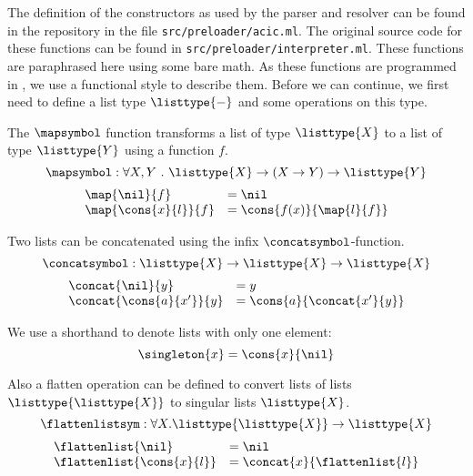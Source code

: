 The definition of the constructors as used by the parser and resolver can be found
in the \roerei repository in the file \lstinline{src/preloader/acic.ml}.
The original source code for these functions can be found in \lstinline{src/preloader/interpreter.ml}.
These functions are paraphrased here using some bare math.
As these functions are programmed in \ocaml, we use a functional style to describe them.
Before we can continue, we first need to define a list type $\listtype{-}$ and some operations on this type.

\begin{definition}[\mapsymbol]
  The $\mapsymbol$ function transforms a list of type $\listtype{X}$ to a list of type $\listtype{Y}$ using a function $f$.
  \[ \mapsymbol : \forall X, Y ~.~ \listtype{X} \rightarrow (X \rightarrow Y) \rightarrow \listtype{Y} \]
  \[ \begin{array}{ll}
      \map{\nil}{f} & = \nil \\
      \map{\cons{x}{l}}{f} & = \cons{f(x)}{\map{l}{f}} \\
    \end{array} \]
\end{definition}

\begin{definition}[\concatsymbol]
  Two lists can be concatenated using the infix $\concatsymbol$-function.
  \[ \concatsymbol : \listtype{X} \rightarrow \listtype{X} \rightarrow \listtype{X} \]
  \[ \begin{array}{ll}
      \concat{\nil}{y} & = y \\
      \concat{\cons{a}{x'}}{y} & = \cons{a}{\concat{x'}{y}} \\
    \end{array} \]
\end{definition}

\begin{definition}[\singleton{-}]
  We use a shorthand to denote lists with only one element:
  \[ \singleton{x} = \cons{x}{\nil} \]
\end{definition}

\begin{definition}[\flattenlistsym]
  Also a flatten operation can be defined to convert lists of lists $\listtype{\listtype{X}}$ to singular lists $\listtype{X}$.
  \[ \flattenlistsym : \forall X . \listtype{\listtype{X}} \rightarrow \listtype{X} \]
  \[ \begin{array}{ll}
      \flattenlist{\nil} & = \nil \\
      \flattenlist{\cons{x}{l}} & = \concat{x}{\flattenlist{l}} \\
    \end{array} \]
\end{definition}

